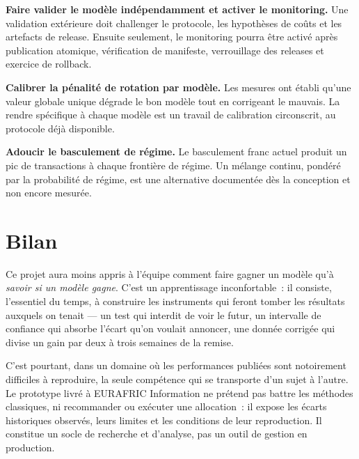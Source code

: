 \textbf{Faire valider le modèle indépendamment et activer le monitoring.} Une
validation extérieure doit challenger le protocole, les hypothèses de coûts et
les artefacts de release. Ensuite seulement, le monitoring pourra être activé
après publication atomique, vérification de manifeste, verrouillage des releases
et exercice de rollback.

\textbf{Calibrer la pénalité de rotation par modèle.} Les mesures ont établi
qu'une valeur globale unique dégrade le bon modèle tout en corrigeant le mauvais.
La rendre spécifique à chaque modèle est un travail de calibration circonscrit,
au protocole déjà disponible.

\textbf{Adoucir le basculement de régime.} Le basculement franc actuel produit un
pic de transactions à chaque frontière de régime. Un mélange continu, pondéré par
la probabilité de régime, est une alternative documentée dès la conception et non
encore mesurée.

\section*{Bilan}

Ce projet aura moins appris à l'équipe comment faire gagner un modèle qu'à
\emph{savoir si un modèle gagne}. C'est un apprentissage inconfortable~: il
consiste, l'essentiel du temps, à construire les instruments qui feront tomber
les résultats auxquels on tenait — un test qui interdit de voir le futur, un
intervalle de confiance qui absorbe l'écart qu'on voulait annoncer, une donnée
corrigée qui divise un gain par deux à trois semaines de la remise.

C'est pourtant, dans un domaine où les performances publiées sont notoirement
difficiles à reproduire, la seule compétence qui se transporte d'un sujet à
l'autre. Le prototype livré à EURAFRIC Information ne prétend pas battre les
méthodes classiques, ni recommander ou exécuter une allocation~: il expose les
écarts historiques observés, leurs limites et les conditions de leur
reproduction. Il constitue un socle de recherche et d'analyse, pas un outil de
gestion en production.
